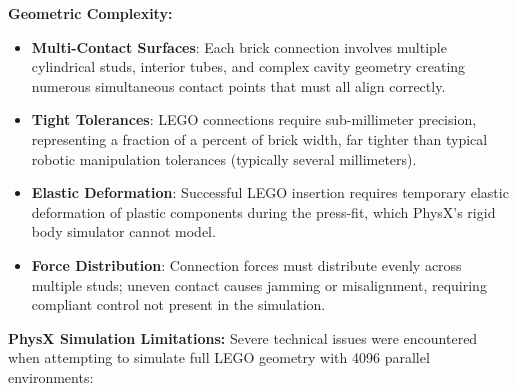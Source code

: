 \documentclass[12pt,a4paper,oneside]{report}
\begin{document}
\textbf{Geometric Complexity:}
\begin{itemize}
    \item \textbf{Multi-Contact Surfaces}: Each brick connection involves multiple cylindrical studs, interior tubes, and complex cavity geometry creating numerous simultaneous contact points that must all align correctly.
    \item \textbf{Tight Tolerances}: LEGO connections require sub-millimeter precision, representing a fraction of a percent of brick width, far tighter than typical robotic manipulation tolerances (typically several millimeters).
    \item \textbf{Elastic Deformation}: Successful LEGO insertion requires temporary elastic deformation of plastic components during the press-fit, which PhysX's rigid body simulator cannot model.
    \item \textbf{Force Distribution}: Connection forces must distribute evenly across multiple studs; uneven contact causes jamming or misalignment, requiring compliant control not present in the simulation.
\end{itemize}

\textbf{PhysX Simulation Limitations:}
Severe technical issues were encountered when attempting to simulate full LEGO geometry with 4096 parallel environments:
\end{document}
